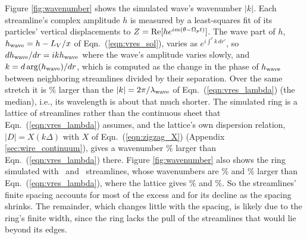 \documentclass[twocolumn]{aastex702}
\begin{document}
Figure \ref{fig:wavenumber} shows the simulated wave's wavenumber $|k|$. Each streamline's complex amplitude $h$ is
measured by a least-squares fit of its particles' vertical displacements to $Z = {\rm Re}[h e^{im(\theta - \Omega_pt)}]$.
The wave part of $h$, $h_{\rm wave} = h - L_V/x$ of Eqn.\ (\ref{eqn:vres_sol}), varies as $e^{i\int^r k\,dr'}$, so
$dh_{\rm wave}/dr = ikh_{\rm wave}$ where the wave's amplitude varies slowly, and $k = d\arg(h_{\rm wave})/dr$,
which is computed as the change in the phase of $h_{\rm wave}$ between neighboring streamlines divided by their
separation. Over the same stretch it is \bwKcontPercent\%
larger than the $|k| = 2\pi/\lambda_{\rm wave}$ of Eqn.\ (\ref{eqn:vres_lambda}) (the median), i.e., its wavelength is
about that much shorter. The simulated ring is a lattice of streamlines rather than the continuous sheet that
Eqn.\ (\ref{eqn:vres_lambda}) assumes, and the lattice's own dispersion relation, $|D| = X(k\Delta)$ with $X$ of
Eqn.\ (\ref{eqn:zigzag_X}) (Appendix \ref{sec:wire_continuum}), gives a wavenumber \bwKlatticePercent\% larger than
Eqn.\ (\ref{eqn:vres_lambda}) there. Figure \ref{fig:wavenumber} also shows the ring
simulated with \bwNstreamlinesCoarse\ and \bwNstreamlinesFine\ streamlines, whose wavenumbers are
\bwKcontPercentCoarse\% and \bwKcontPercentFine\% larger than Eqn.\ (\ref{eqn:vres_lambda}), where the lattice gives
\bwKlatticePercentCoarse\% and \bwKlatticePercentFine\%. So the streamlines' finite spacing accounts for most of the
excess and for its decline as the spacing shrinks. The remainder, which changes little with the spacing, is likely
due to the ring's finite width, since the ring lacks the pull of the streamlines that would lie beyond its edges.
\end{document}
